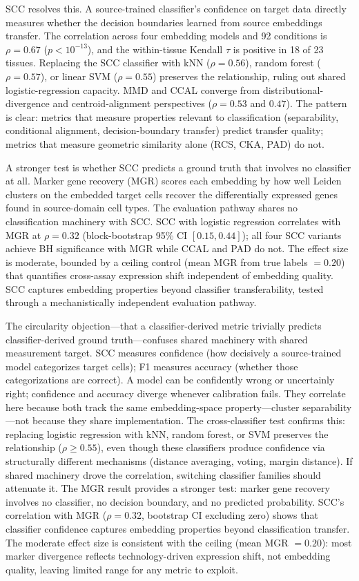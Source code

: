 \documentclass[11pt]{article}
\begin{document}
SCC resolves this. A source-trained classifier's confidence on target
data directly measures whether the decision boundaries learned from
source embeddings transfer. The correlation across four embedding
models and 92 conditions is $\rho = 0.67$ ($p < 10^{-13}$), and the
within-tissue Kendall $\tau$ is positive in 18 of 23 tissues.
Replacing the SCC classifier with kNN ($\rho = 0.56$), random forest
($\rho = 0.57$), or linear SVM ($\rho = 0.55$) preserves the
relationship, ruling out shared logistic-regression capacity. MMD and
CCAL converge from distributional-divergence and centroid-alignment
perspectives ($\rho = 0.53$ and $0.47$). The pattern is clear:
metrics that measure properties relevant to classification
(separability, conditional alignment, decision-boundary transfer)
predict transfer quality; metrics that measure geometric similarity
alone (RCS, CKA, PAD) do not.

A stronger test is whether SCC predicts a ground truth that involves
no classifier at all. Marker gene recovery (MGR) scores each embedding
by how well Leiden clusters on the embedded target cells recover the
differentially expressed genes found in source-domain cell types. The
evaluation pathway shares no classification machinery with SCC. SCC
with logistic regression correlates with MGR at $\rho = 0.32$
(block-bootstrap 95\% CI $[0.15, 0.44]$); all four SCC variants
achieve BH significance with MGR while CCAL and PAD do not. The
effect size is moderate, bounded by a ceiling control (mean MGR from
true labels $= 0.20$) that quantifies cross-assay expression shift
independent of embedding quality. SCC captures embedding properties
beyond classifier transferability, tested through a mechanistically
independent evaluation pathway.

The circularity objection---that a classifier-derived metric trivially
predicts classifier-derived ground truth---confuses shared machinery
with shared measurement target. SCC measures confidence (how decisively
a source-trained model categorizes target cells); F1 measures accuracy
(whether those categorizations are correct). A model can be confidently
wrong or uncertainly right; confidence and accuracy diverge whenever
calibration fails. They correlate here because both track the same
embedding-space property---cluster separability---not because they share
implementation. The cross-classifier test confirms this: replacing
logistic regression with kNN, random forest, or SVM preserves the
relationship ($\rho \geq 0.55$), even though these classifiers produce
confidence via structurally different mechanisms (distance averaging,
voting, margin distance). If shared machinery drove the correlation,
switching classifier families should attenuate it. The MGR result
provides a stronger test: marker gene recovery involves no classifier,
no decision boundary, and no predicted probability. SCC's correlation
with MGR ($\rho = 0.32$, bootstrap CI excluding zero) shows that
classifier confidence captures embedding properties beyond
classification transfer. The moderate effect size is consistent with
the ceiling (mean MGR $= 0.20$): most marker divergence reflects
technology-driven expression shift, not embedding quality, leaving
limited range for any metric to exploit.
\end{document}
